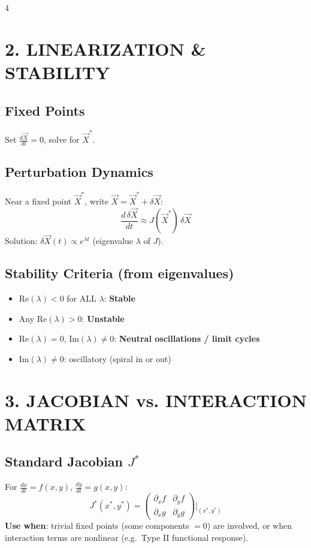 \documentclass[8pt,landscape]{article}
\begin{document}
\begin{multicols}{4}
\section{2. LINEARIZATION \& STABILITY}

\subsection{Fixed Points}
Set $\frac{d\vec{X}}{dt} = 0$, solve for $\vec{X}^*$.

\subsection{Perturbation Dynamics}
Near a fixed point $\vec{X}^*$, write $\vec{X} = \vec{X}^* + \delta\vec{X}$:
\[
\frac{d\,\delta\vec{X}}{dt} \approx J(\vec{X}^*)\,\delta\vec{X}
\]
Solution: $\delta\vec{X}(t) \propto e^{\lambda t}$ (eigenvalue $\lambda$ of $J$).

\subsection{Stability Criteria (from eigenvalues)}
\begin{itemize}
  \item $\text{Re}(\lambda) < 0$ for ALL $\lambda$: \textbf{Stable}
  \item Any $\text{Re}(\lambda) > 0$: \textbf{Unstable}
  \item $\text{Re}(\lambda) = 0$, $\text{Im}(\lambda) \neq 0$: \textbf{Neutral oscillations / limit cycles}
  \item $\text{Im}(\lambda) \neq 0$: oscillatory (spiral in or out)
\end{itemize}

\section{3. JACOBIAN vs. INTERACTION MATRIX}

\subsection{Standard Jacobian $J^*$}
For $\frac{dx}{dt} = f(x,y)$, $\frac{dy}{dt} = g(x,y)$:
\[
J^*(x^*,y^*) = \begin{pmatrix} \partial_x f & \partial_y f \\ \partial_x g & \partial_y g \end{pmatrix}\bigg|_{(x^*,y^*)}
\]
\textbf{Use when}: trivial fixed points (some components $= 0$) are involved, or when interaction terms are nonlinear (e.g.\ Type II functional response).


\end{multicols}
\end{document}
